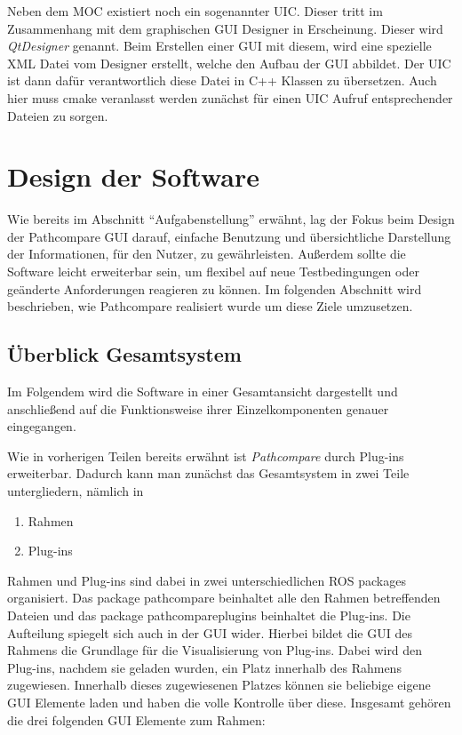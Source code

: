 Neben dem \gls{MOC} existiert noch ein sogenannter \gls{UIC}. Dieser tritt im
Zusammenhang mit dem graphischen GUI Designer in Erscheinung. Dieser wird
\textit{QtDesigner} genannt. Beim Erstellen einer GUI mit diesem, wird eine
spezielle XML Datei vom Designer erstellt, welche den Aufbau der GUI abbildet.
Der UIC ist dann dafür verantwortlich diese Datei in C++ Klassen zu übersetzen.
Auch hier muss cmake veranlasst werden zunächst für einen \gls{UIC} Aufruf
entsprechender Dateien zu sorgen.


\section{Design der Software}
Wie bereits im Abschnitt ``Aufgabenstellung'' erwähnt, lag der Fokus beim
Design der Pathcompare GUI darauf, einfache Benutzung und übersichtliche
Darstellung der Informationen, für den Nutzer, zu gewährleisten.  Außerdem
sollte die Software leicht erweiterbar sein, um flexibel auf neue
Testbedingungen oder geänderte Anforderungen reagieren zu können.
Im folgenden Abschnitt wird beschrieben, wie Pathcompare realisiert wurde um
diese Ziele umzusetzen.

\subsection{Überblick Gesamtsystem}

Im Folgendem wird die Software in einer Gesamtansicht dargestellt und
anschließend auf die Funktionsweise ihrer Einzelkomponenten genauer eingegangen.

Wie in vorherigen Teilen bereits erwähnt ist \textit{Pathcompare} durch
Plug-ins erweiterbar. Dadurch kann man zunächst das Gesamtsystem in zwei Teile
untergliedern, nämlich in 

\begin{enumerate}
  \item Rahmen
  \item Plug-ins
\end{enumerate}

Rahmen und Plug-ins sind dabei in zwei unterschiedlichen ROS packages
organisiert. Das package pathcompare beinhaltet alle den Rahmen betreffenden
Dateien und das package pathcompareplugins beinhaltet die Plug-ins.
Die Aufteilung spiegelt sich auch in der GUI wider.
Hierbei bildet die GUI des Rahmens die Grundlage für die Visualisierung von Plug-ins.
Dabei wird den Plug-ins, nachdem sie geladen wurden, ein Platz innerhalb des
Rahmens zugewiesen. Innerhalb dieses zugewiesenen Platzes können sie beliebige
eigene GUI Elemente laden und haben die volle Kontrolle über diese. Insgesamt
gehören die drei folgenden GUI Elemente zum Rahmen:


